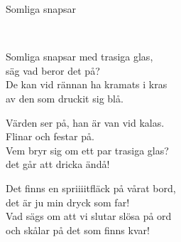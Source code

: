 \begin{song}{Somliga snapsar}
	

	\\
	
	Somliga snapsar med trasiga glas,\\
	säg vad beror det på?\\
	De kan vid rännan ha kramats i kras\\
	av den som druckit sig blå.

	Värden ser på, han är van vid kalas.\\
	Flinar och festar på.\\
	Vem bryr sig om ett par trasiga glas?\\
	det går att dricka ändå!

	Det finns en spriiiitfläck på vårat bord,\\
	det är ju min dryck som far!\\
	Vad sägs om att vi slutar slösa på ord\\
	och skålar på det som finns kvar!

	
\end{song}
